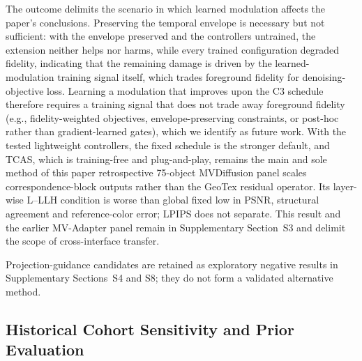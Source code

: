 \documentclass[times,twocolumn,final]{elsarticle}
\providecommand{\DIFadd}[1]{{\protect\color{blue} \sf #1}} %
\providecommand{\DIFdel}[1]{{\protect\color{red} \scriptsize #1}} %
\providecommand{\DIFaddbegin}{} %
\providecommand{\DIFaddend}{} %
\providecommand{\DIFdelbegin}{} %
\providecommand{\DIFdelend}{} %
\begin{document}
The \DIFdelbegin \DIFdel{outcome delimits the scenario in which learned modulation affects the paper's conclusions. Preserving the temporal envelope is necessary but not sufficient: with the envelope preserved and the controllers untrained, the extension neither helps nor harms, while every trained configuration degraded fidelity, indicating that the remaining damage is driven by the learned-modulation training signal itself, which trades foreground fidelity for denoising-objective loss. Learning a modulation that improves upon the C3 schedule therefore requires a training signal that does not trade away foreground fidelity (e.g., fidelity-weighted objectives, envelope-preserving constraints, or post-hoc rather than gradient-learned gates), which we identify as future work. With the tested lightweight controllers, the fixed schedule is the stronger default, and TCAS, which is training-free and plug-and-play, remains the main and sole method of this paper}\DIFdelend \DIFaddbegin \DIFadd{retrospective 75-object MVDiffusion panel scales correspondence-block outputs rather than the GeoTex residual operator. Its layer-wise L--LLH condition is worse than global fixed low in PSNR, structural agreement and reference-color error; LPIPS does not separate. This result and the earlier MV-Adapter panel remain in Supplementary Section~S3 and delimit the scope of cross-interface transfer}\DIFaddend .

\DIFdelbegin %
\DIFdelend \DIFaddbegin \DIFadd{Projection-guidance candidates are retained as exploratory negative results in Supplementary Sections~S4 and S8; they do not form a validated alternative method.
}\DIFaddend

\DIFdelbegin %
\DIFdelend \DIFaddbegin \subsection{Historical Cohort Sensitivity and Prior Evaluation}
\label{subsec:original276}
\DIFaddend
\end{document}
